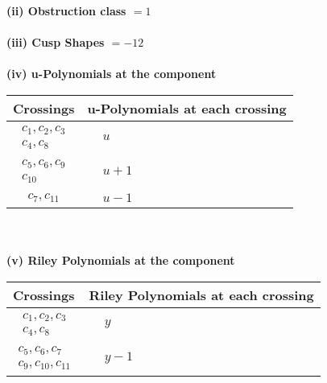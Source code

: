 \documentclass[1p]{elsarticle_modified}
\theoremstyle{definition}
\begin{document}
\flushleft \textbf{(ii) Obstruction class $= 1$}\\~\\
\flushleft \textbf{(iii) Cusp Shapes $= -12$}\\~\\
\newpage\renewcommand{\arraystretch}{1}
\flushleft \textbf{(iv) u-Polynomials at the component}\newline \\
\begin{tabular}{m{50pt}|m{274pt}}
Crossings & \hspace{64pt}u-Polynomials at each crossing \\
\hline $$\begin{aligned}c_{1},c_{2},c_{3}\\c_{4},c_{8}\end{aligned}$$&$\begin{aligned}
&u
\end{aligned}$\\
\hline $$\begin{aligned}c_{5},c_{6},c_{9}\\c_{10}\end{aligned}$$&$\begin{aligned}
&u+1
\end{aligned}$\\
\hline $$\begin{aligned}c_{7},c_{11}\end{aligned}$$&$\begin{aligned}
&u-1
\end{aligned}$\\
\hline
\end{tabular}\\~\\
\newpage\renewcommand{\arraystretch}{1}
\flushleft \textbf{(v) Riley Polynomials at the component}\newline \\
\begin{tabular}{m{50pt}|m{274pt}}
Crossings & \hspace{64pt}Riley Polynomials at each crossing \\
\hline $$\begin{aligned}c_{1},c_{2},c_{3}\\c_{4},c_{8}\end{aligned}$$&$\begin{aligned}
&y
\end{aligned}$\\
\hline $$\begin{aligned}c_{5},c_{6},c_{7}\\c_{9},c_{10},c_{11}\end{aligned}$$&$\begin{aligned}
&y-1
\end{aligned}$\\
\hline
\end{tabular}\\~\\
\end{document}
